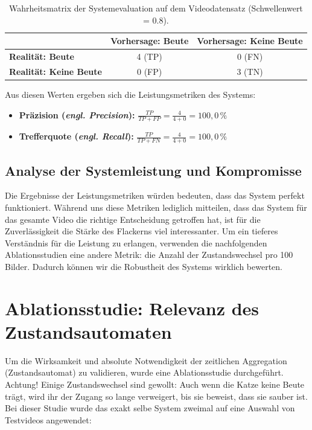 \begin{table}[H]
    \centering
    \begin{tabular}{|l|c|c|}
        \hline
         & \textbf{Vorhersage: Beute} & \textbf{Vorhersage: Keine Beute} \\
        \hline
        \textbf{Realität: Beute} & 4 (TP) & 0 (FN) \\
        \hline
        \textbf{Realität: Keine Beute} & 0 (FP) & 3 (TN) \\
        \hline
    \end{tabular}
    \caption{Wahrheitsmatrix der Systemevaluation auf dem Videodatensatz (Schwellenwert = 0.8).}
    \label{tab:system_eval}
\end{table}

Aus diesen Werten ergeben sich die Leistungsmetriken des Systems:

\begin{itemize}
    \item \textbf{Präzision (\emph{engl. Precision}):} $\frac{TP}{TP+FP} = \frac{4}{4+0} = 100,0\,\%$
    \item \textbf{Trefferquote (\emph{engl. Recall}):} $\frac{TP}{TP+FN} = \frac{4}{4+0} = 100,0\,\%$
\end{itemize}

\subsection{Analyse der Systemleistung und Kompromisse}
Die Ergebnisse der Leistungsmetriken würden bedeuten, dass das System perfekt funktioniert. Während uns diese Metriken lediglich mitteilen, dass das System für das gesamte Video die richtige Entscheidung getroffen hat, ist für die Zuverlässigkeit die Stärke des Flackerns viel interessanter. Um ein tieferes Verständnis für die Leistung zu erlangen, verwenden die nachfolgenden Ablationsstudien eine andere Metrik: die Anzahl der Zustandswechsel pro 100 Bilder. Dadurch können wir die Robustheit des Systems wirklich bewerten.

\section{Ablationsstudie: Relevanz des Zustandsautomaten}
Um die Wirksamkeit und absolute Notwendigkeit der zeitlichen Aggregation (Zustandsautomat) zu validieren, wurde eine Ablationsstudie durchgeführt. Achtung! Einige Zustandswechsel sind gewollt: Auch wenn die Katze keine Beute trägt, wird ihr der Zugang so lange verweigert, bis sie beweist, dass sie sauber ist. Bei dieser Studie wurde das exakt selbe System zweimal auf eine Auswahl von Testvideos angewendet:

